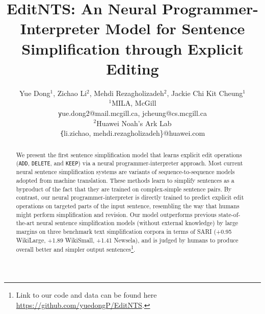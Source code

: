 \documentclass[11pt,a4paper]{article}
\title{EditNTS: An Neural Programmer-Interpreter Model for Sentence Simplification through Explicit Editing}
\author{Yue Dong$^1$, Zichao Li$^2$, Mehdi Rezagholizadeh$^2$, Jackie Chi Kit Cheung$^1$\\
$^1$MILA, McGill\\
{\texttt yue.dong2@mail.mcgill.ca, jcheung@cs.mcgill.ca}\\
$^2$Huawei Noah's Ark Lab\\
{\texttt \{li.zichao, mehdi.rezagholizadeh\}@huawei.com}}
\date{}
\def\add{{\texttt{ADD}}}
\def\delete{{\texttt{DELETE}}}
\def\keep{{\texttt{KEEP}}}
\def\wikilarge{WikiLarge}
\def\wikismall{WikiSmall}
\def\newsela{Newsela}
\begin{document}
\maketitle
\begin{abstract}
We present the first sentence simplification model that learns explicit edit operations (\add, \delete, and \keep) via a neural programmer-interpreter approach. Most current neural sentence simplification systems are variants of sequence-to-sequence models adopted from machine translation. These methods learn to simplify sentences as a byproduct of the fact that they are trained on complex-simple sentence pairs. By contrast, our neural programmer-interpreter is directly trained to predict explicit edit operations on targeted parts of the input sentence, resembling the way that humans might perform simplification and revision. Our model outperforms previous state-of-the-art neural sentence simplification models (without external knowledge) by large margins on three benchmark text simplification corpora in terms of SARI (+0.95 \wikilarge, +1.89 \wikismall, +1.41 \newsela), and is judged by humans to produce overall better and simpler output sentences\footnote{Link to our code and data can be found here \url{https://github.com/yuedongP/EditNTS}.}. 
\end{abstract}
\end{document}
